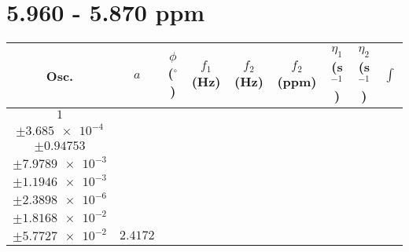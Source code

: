 \documentclass[8pt]{article}
\begin{document}
\section*{5.960 - 5.870 ppm}
\begin{longtable}[l]{c c c c c c c c c}
\toprule
Osc. & $a$ & $\phi$ ($^{\circ}$) & $f_1$ (Hz) & $f_2$ (Hz) & $f_2$ (ppm) & $\eta_1$ (s$^{-1}$) & $\eta_2$ (s$^{-1}$) & $\int$\\
\midrule
$\num{1}$ & \begin{tabular}[c]{@{}c@{}}$\num{3.3711e-2}$ \\ $\pm\num{3.685e-4}$\end{tabular} & \begin{tabular}[c]{@{}c@{}}$\num{-2.5215}$ \\ $\pm\num{0.94753}$\end{tabular} & \begin{tabular}[c]{@{}c@{}}$\num{-7.4859}$ \\ $\pm\num{7.9789e-3}$\end{tabular} & \begin{tabular}[c]{@{}c@{}}$\num{2.9493e+3}$ \\ $\pm\num{1.1946e-3}$\end{tabular} & \begin{tabular}[c]{@{}c@{}}$\num{5.9003}$ \\ $\pm\num{2.3898e-6}$\end{tabular} & \begin{tabular}[c]{@{}c@{}}$\num{2.6554}$ \\ $\pm\num{1.8168e-2}$\end{tabular} & \begin{tabular}[c]{@{}c@{}}$\num{4.9155}$ \\ $\pm\num{5.7727e-2}$\end{tabular} & $\num{2.4172}$\\

\end{longtable}
\end{document}

